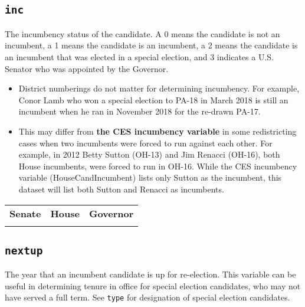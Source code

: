 \documentclass[12pt]{article}
\begin{document}
\twocolumn
\begin{adjustwidth}{-2em}{-2em}
\centering
{\scriptsize

}
\end{adjustwidth}

\onecolumn



\subsection*{\texttt{inc}}

The incumbency status of the candidate. A 0 means the candidate is not an incumbent, a 1 means the candidate is an incumbent, a 2 means the candidate is an incumbent that was elected in a special election, and 3 indicates a U.S. Senator who was appointed by the Governor.
\begin{itemize}
\item District numberings do not matter for determining incumbency. For example, Conor Lamb who won a special election to PA-18 in March 2018 is still an incumbent when he ran in November 2018 for the re-drawn PA-17.
\item This may differ from \textbf{the CES incumbency variable} in some redistricting cases when two incumbents were forced to run against each other. For example, in 2012 Betty Sutton (OH-13) and Jim Renacci (OH-16), both House incumbents, were forced to run in OH-16. While the CES incumbency variable (HouseCandIncumbent) lists only Sutton as the incumbent, this dataset will list both Sutton and Renacci as incumbents.

\end{itemize}

    \begin{tabularx}{\linewidth}{CCC}
    \textbf{Senate} & \textbf{House} & \textbf{Governor}\\
     &  & 
    \end{tabularx}


\FloatBarrier


\subsection*{\texttt{nextup}}

The year that an incumbent candidate is up for re-election. This variable can be useful in determining tenure in office for special election candidates, who may not have served a full term. See \texttt{type} for designation of special election candidates.
\end{document}

